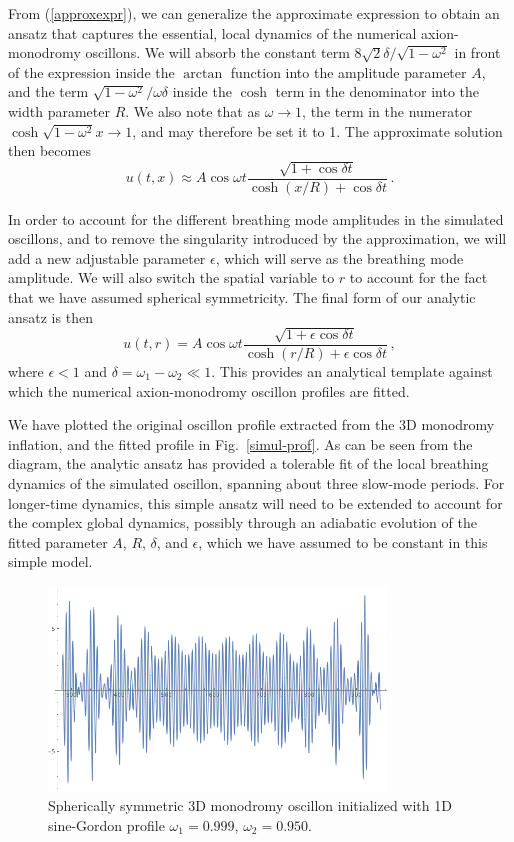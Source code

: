 \documentclass[11pt]{book}
\begin{document}
From (\ref{approxexpr}), we can generalize the approximate expression to obtain an ansatz that captures the essential, local dynamics of the numerical axion-monodromy oscillons. We will absorb the constant term $8\sqrt{2}  \delta/\sqrt{1-\omega^2}$ in front of the expression inside the $\arctan$ function into the amplitude parameter $A$, and the term $\sqrt{1-\omega^2}/\omega\delta$ inside the $\cosh$ term in the denominator into the width parameter $R$. We also note that as $\omega\to1$, the term in the numerator $\cosh\sqrt{1-\omega^2} x\to1$, and may therefore be set it to 1. The approximate solution then becomes
\begin{equation}
  u(t,x) \approx A \cos\omega t \frac{\sqrt{1+\cos\delta t} }{\cosh(x/R) + \cos \delta t}\,.
\end{equation}

In order to account for the different breathing mode amplitudes in the simulated oscillons, and to remove the singularity introduced by the approximation, we will add a new adjustable parameter $\epsilon$, which will serve as the breathing mode amplitude. We will also switch the spatial variable to $r$ to account for the fact that we have assumed spherical symmetricity. The final form of our analytic ansatz is then
\begin{equation} \label{fitprof}
  u(t,r) = A\cos\omega t \frac{\sqrt{1+\epsilon \cos \delta t}}{\cosh(r/R) + \epsilon \cos \delta t}\,,
\end{equation}
where $\epsilon<1$ and $\delta = \omega_1-\omega_2 \ll 1$. This provides an analytical template against which the numerical axion-monodromy oscillon profiles are fitted.

We have plotted the original oscillon profile extracted from the 3D monodromy inflation, and the fitted profile in Fig.~\ref{simul-prof}. As can be seen from the diagram, the analytic ansatz has provided a tolerable fit of the local breathing dynamics of the simulated oscillon, spanning about three slow-mode periods. For longer-time dynamics, this simple ansatz will need to be extended to account for the complex global dynamics, possibly through an adiabatic evolution of the fitted parameter $A$, $R$, $\delta$, and $\epsilon$, which we have assumed to be constant in this simple model.

\begin{figure}
  \centering
  \includegraphics[width=0.8\textwidth]{plot/profile-3scale.png}
  \caption{Spherically symmetric 3D monodromy oscillon initialized with 1D
    sine-Gordon profile $\omega_1=0.999$, $\omega_2=0.950$.}\label{threescales}
\end{figure}
\end{document}
